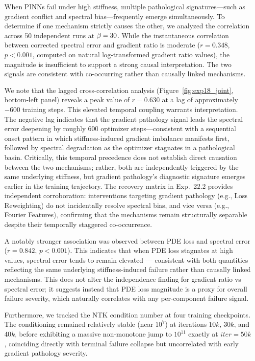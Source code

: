 When PINNs fail under high stiffness, multiple pathological signatures—such as gradient conflict and spectral bias—frequently emerge simultaneously. To determine if one mechanism strictly causes the other, we analyzed the correlation across 50 independent runs at $\beta=30$. While the instantaneous correlation between corrected spectral error and gradient ratio is moderate ($r=0.348$, $p < 0.001$, computed on natural log-transformed gradient ratio values), the magnitude is insufficient to support a strong causal interpretation. The two signals are consistent with co-occurring rather than causally linked mechanisms.

We note that the lagged cross-correlation analysis (Figure~\ref{fig:exp18_joint}, bottom-left panel) reveals a peak value of $r=0.630$ at a lag of approximately $-600$ training steps. This elevated temporal coupling warrants interpretation. The negative lag indicates that the gradient pathology signal leads the spectral error deepening by roughly $600$ optimizer steps—consistent with a sequential onset pattern in which stiffness-induced gradient imbalance manifests first, followed by spectral degradation as the optimizer stagnates in a pathological basin. Critically, this temporal precedence does not establish direct causation between the two mechanisms; rather, both are independently triggered by the same underlying stiffness, but gradient pathology's diagnostic signature emerges earlier in the training trajectory. The recovery matrix in Exp.~22.2 provides independent corroboration: interventions targeting gradient pathology (e.g., Loss Reweighting) do not incidentally resolve spectral bias, and vice versa (e.g., Fourier Features), confirming that the mechanisms remain structurally separable despite their temporally staggered co-occurrence.

A notably stronger association was observed between PDE loss and spectral error ($r = 0.842$, $p < 0.001$). This indicates that when PDE loss stagnates at high values, spectral error tends to remain elevated — consistent with both quantities reflecting the same underlying stiffness-induced failure rather than causally linked mechanisms. This does not alter the independence finding for gradient ratio vs spectral error; it suggests instead that PDE loss magnitude is a proxy for overall failure severity, which naturally correlates with any per-component failure signal.

Furthermore, we tracked the NTK condition number at four training checkpoints. The conditioning remained relatively stable (near $10^{7}$) at iterations $10k$, $30k$, and $40k$, before exhibiting a massive non-monotone jump to $10^{11}$ exactly at $iter=50k$, coinciding directly with terminal failure collapse but uncorrelated with early gradient pathology severity.

